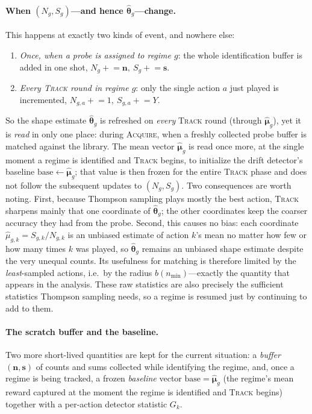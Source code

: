 \documentclass[11pt]{article}
\newcommand{\ACQ}{\textsc{Acquire}\xspace}
\newcommand{\TRACK}{\textsc{Track}\xspace}
\begin{document}
\paragraph{When $(N_g,S_g)$---and hence $\widehat{\bm\theta}_g$---change.}
This happens at exactly two kinds of event, and nowhere else:
\begin{enumerate}[leftmargin=1.8em,label=(\roman*),itemsep=1pt]
\item \emph{Once, when a probe is assigned to regime $g$}: the whole identification buffer is added
in one shot, $N_g \mathrel{+}= \bm n,\ S_g \mathrel{+}= \bm s$.
\item \emph{Every \TRACK round in regime $g$}: only the single action $a$ just played is
incremented, $N_{g,a}\mathrel{+}=1,\ S_{g,a}\mathrel{+}=Y$.
\end{enumerate}
So the shape estimate $\widehat{\bm\theta}_g$ is refreshed on \emph{every} \TRACK round (through
$\widehat{\bm\mu}_g$), yet it is \emph{read} in only one place: during \ACQ, when a freshly collected
probe buffer is matched against the library. The mean vector $\widehat{\bm\mu}_g$ is read once more,
at the single moment a regime is identified and \TRACK begins, to initialize the drift detector's
baseline $\mathrm{base}\gets\widehat{\bm\mu}_g$; that value is then frozen for the entire \TRACK
phase and does not follow the subsequent updates to $(N_g,S_g)$. Two consequences are worth noting. First, because
Thompson sampling plays mostly the best action, \TRACK sharpens mainly that one coordinate of
$\widehat{\bm\theta}_g$; the other coordinates keep the coarser accuracy they had from the probe.
Second, this causes no bias: each coordinate $\widehat\mu_{g,k}=S_{g,k}/N_{g,k}$ is an unbiased
estimate of action $k$'s mean no matter how few or how many times $k$ was played, so
$\widehat{\bm\theta}_g$ remains an unbiased shape estimate despite the very unequal counts. Its
usefulness for matching is therefore limited by the \emph{least}-sampled actions, i.e.\ by the
radius $b(n_{\min})$---exactly the quantity that appears in the analysis. These raw statistics are
also precisely the sufficient statistics Thompson sampling needs, so a regime is resumed just by
continuing to add to them.

\paragraph{The scratch buffer and the baseline.}
Two more short-lived quantities are kept for the current situation: a \emph{buffer} $(\bm n,\bm s)$
of counts and sums collected while identifying the regime, and, once a regime is being tracked, a
frozen \emph{baseline} vector $\mathrm{base}=\widehat{\bm\mu}_g$ (the regime's mean reward captured
at the moment the regime is identified and \TRACK begins) together with a per-action detector
statistic $G_k$.
\end{document}
